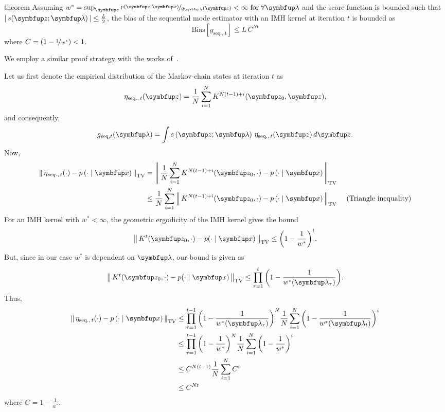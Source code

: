 
\begin{theoremEnd}{theorem}\label{thm:bias_seq}
  Assuming \(w^* = \sup_{\vz} \nicefrac{p\left(\vz\mid\vx\right)}{q_{\vlambda}\left(\vz\right)} < \infty\; \text{for} \; \forall \vlambda \) and the score function is bounded such that \(\left|\,s(\vz; \vlambda)\,\right| \leq \frac{L}{2}\), the bias of the sequential mode estimator with an IMH kernel at iteration \(t\) is bounded as
  {\small
  \[
    \mathrm{Bias}\left[ g_{\mathrm{seq.,\, t}} \right] \leq L \, C^{N t} 
  \]
  }
  where \(C = \left(1 - \nicefrac{1}{w^*}\right) < 1\).
\end{theoremEnd}
%
\begin{proofEnd}
  We employ a similar proof strategy with the works of~\citet[Theorem 4]{jiang_mcmc_2021}.

  Let us first denote the empirical distribution of the Markov-chain states at iteration \(t\) as
  \begin{align}
    \eta_{\mathrm{seq.},\, t}(\vz) = \frac{1}{N} \sum_{i=1}^N K^{N (t-1) + i}(\vz_0, \vz),
  \end{align}
  and consequently,
  \begin{align}
      g_{\mathrm{seq}, t}(\vlambda) = \int s\left(\vz; \vlambda\right) \, \eta_{\mathrm{seq.},\, t}(\vz) \, d\vz.
  \end{align}
  Now,
  \begin{align}
    \DTV{ \eta_{seq.,\, t}(\cdot) }{p\left(\cdot\mid\vx\right)}
    &= \DTV{\frac{1}{N} \sum_{i=1}^N K^{N (t-1) + i}(\vz_0, \cdot)}{p\left(\cdot\mid\vx\right)} \\
    &\leq \frac{1}{N} \sum_{i=1}^N  \DTV{K^{N (t-1) + i}(\vz_0, \cdot)}{p\left(\cdot\mid\vx\right)} &\text{ (Triangle inequality)}
  \end{align}
 For an IMH kernel with \(w^* < \infty\), the geometric ergodicity of the IMH kernel \citep[Theorem 2.1]{10.2307/2242610} gives the bound
 \begin{align}
   \DTV{K^t(\vz_{0}, \cdot)}{p(\cdot\mid\vx)} \leq {\left(1 - \frac{1}{w^*}\right)}^t.
 \end{align}
 But, since in our case \(w^*\) is dependent on \(\vlambda\), our bound is given as
 \begin{align}
   \DTV{K^t(\vz_{0}, \cdot)}{p(\cdot\mid\vx)} \leq \prod_{\tau=1}^t {\left(1 - \frac{1}{w^*(\vlambda_{\tau})}\right)}.
 \end{align}
 Thus, 
  \begin{align}
    \DTV{ \eta_{\mathrm{seq.},\, t}(\cdot) }{p\left(\cdot\mid\vx\right)}
    &\leq  \prod_{\tau=1}^{t-1} {\left( 1 - \frac{1}{w^*(\vlambda_{\tau})} \right)}^N \frac{1}{N} \sum_{i=1}^N {\left( 1 - \frac{1}{w^*(\vlambda_{t})} \right)}^i \\
    &\leq  \prod_{\tau=1}^{t-1} {\left( 1 - \frac{1}{w^*} \right)}^N \frac{1}{N} \sum_{i=1}^N {\left( 1 - \frac{1}{w^*} \right)}^i \\
    &\leq C^{N (t-1)} \frac{1}{N} \sum_{i=1}^N C^i \\
    &\leq C^{N t}
  \end{align}
  where \(C = 1 - \frac{1}{w^*} \).


\end{proofEnd}
